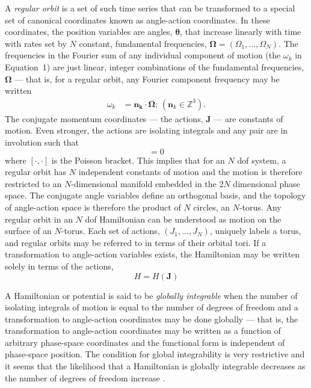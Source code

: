 \documentclass[letterpaper,12pt,preprint]{aastex}
\begin{document}
A \emph{regular orbit} is a set of such time series that can be transformed to a special set of canonical coordinates known as angle-action coordinates. In these coordinates, the position variables are angles, $\boldsymbol{\theta}$, that increase linearly with time with rates set by $N$ constant, fundamental frequencies, $\boldsymbol{\Omega} = (\Omega_1, ..., \Omega_N)$. The frequencies in the Fourier sum of any individual component of motion (the $\omega_k$ in Equation~1) are just linear, integer combinations of the fundamental frequencies, $\boldsymbol{\Omega}$ --- that is, for a regular orbit, any Fourier component frequency may be written
\begin{align}
	\omega_k &= \boldsymbol{n_k} \cdot \boldsymbol{\Omega}; \, (\boldsymbol{n}_k \in \mathbb{Z}^3). \label{eq:fourierfreq}
\end{align}
The conjugate momentum coordinates --- the actions,  $\boldsymbol{J}$ --- are constants of motion. Even stronger, the actions are isolating integrals and any pair are in involution such that
\begin{equation}
	[J_i, J_j] = 0
\end{equation}
where $[\cdot,\cdot]$ is the Poisson bracket. This implies that for an $N$ dof system, a regular orbit has $N$ independent constants of motion and the motion is therefore restricted to an $N$-dimensional manifold embedded in the 2$N$ dimensional phase space. The conjugate angle variables define an orthogonal basis, and the topology of angle-action space is therefore the product of $N$ circles, an $N$-torus. Any regular orbit in an $N$ dof Hamiltonian can be understood as motion on the surface of an $N$-torus. Each set of actions, $(J_1,...,J_N)$, uniquely labels a torus, and regular orbits may be referred to in terms of their orbital tori. If a transformation to angle-action variables exists, the Hamiltonian may be written solely in terms of the actions,
\begin{equation}
	H = H(\boldsymbol{J})
\end{equation}

A Hamiltonian or potential is said to be \emph{globally integrable} when the number of isolating integrals of motion is equal to the number of degrees of freedom and a transformation to angle-action coordinates may be done globally --- that is, the transformation to angle-action coordinates may be written as a function of arbitrary phase-space coordinates and the functional form is independent of phase-space position. The condition for global integrability is very restrictive and it seems that the likelihood that a Hamiltonian is globally integrable decreases as the number of degrees of freedom increase \citep[e.g.,][]{lichtenberg83}. 
\end{document}
